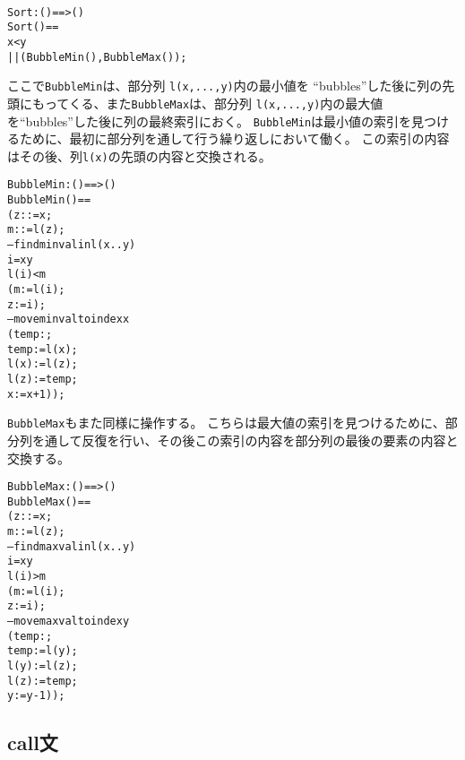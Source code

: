 \documentclass[\pformat,12pt]{jarticle}
\begin{document}
\begin{description}
  \begin{alltt}\label{sortDef}
  Sort: () ==> ()
  Sort () ==
     x < y 
      ||(BubbleMin(), BubbleMax());
  \end{alltt}
ここで\texttt{BubbleMin}は、部分列 \texttt{l(x,...,y)}内の最小値を ``bubbles''した後に列の先頭にもってくる、また\texttt{BubbleMax}は、部分列 \texttt{l(x,...,y)}内の最大値を``bubbles''した後に列の最終索引におく。
\texttt{BubbleMin}は最小値の索引を見つけるために、最初に部分列を通して行う繰り返しにおいて働く。
この索引の内容はその後、列\texttt{l(x)}の先頭の内容と交換される。
  \begin{alltt}
  BubbleMin : () ==> ()
  BubbleMin () ==
    ( z: := x;
      m: := l(z);
     -- find min val in l(x..y)
      i = x  y 
        l(i) < m
        ( m := l(i);
              z := i);
     -- move min val to index x
     ( temp:;
      temp := l(x);
      l(x) := l(z);
      l(z) := temp;
      x := x+1));
\end{alltt}
\texttt{BubbleMax}もまた同様に操作する。
こちらは最大値の索引を見つけるために、部分列を通して反復を行い、その後この索引の内容を部分列の最後の要素の内容と交換する。
\begin{alltt}
  BubbleMax : () ==> ()
  BubbleMax () ==
    ( z: := x;
      m: := l(z);
     -- find max val in l(x..y)
      i = x  y 
        l(i) > m
        ( m := l(i);
              z := i);
     -- move max val to index y
     ( temp:;
      temp := l(y);
      l(y) := l(z);
      l(z) := temp;
      y := y-1));
  \end{alltt}
\end{description}

\subsection{call文}
\label{call-stmt}
\end{document}
